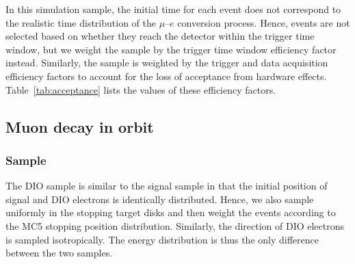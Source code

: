 In this simulation sample, the initial time for each event does not correspond
to the realistic time distribution of the $\mu$--$e$ conversion process. Hence,
events are not selected based on whether they reach the detector within the
trigger time window, but we weight the sample by the trigger time window
efficiency factor instead. Similarly, the sample is weighted by the trigger and
data acquisition efficiency factors to account for the loss of acceptance from
hardware effects. Table~\ref{tab:acceptance} lists the values of these
efficiency factors.


\subsection{Muon decay in orbit}
\subsubsection{Sample}
The DIO sample is similar to the signal sample in that the initial position
of signal and DIO electrons is identically distributed. Hence, we also sample
uniformly in the stopping target disks and then weight the events according to
the MC5 stopping position distribution. Similarly, the direction of DIO
electrons is sampled isotropically. The energy distribution is thus the only
difference between the two samples. 

